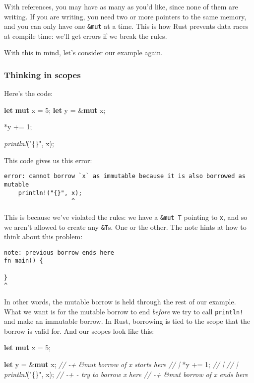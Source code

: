 \documentclass[a4paper,]{book}
\newenvironment{Shaded}{\begin{snugshade}}{\end{snugshade}}
\newcommand{\KeywordTok}[1]{\textcolor[rgb]{0.13,0.29,0.53}{\textbf{{#1}}}}
\newcommand{\DecValTok}[1]{\textcolor[rgb]{0.00,0.00,0.81}{{#1}}}
\newcommand{\StringTok}[1]{\textcolor[rgb]{0.31,0.60,0.02}{{#1}}}
\newcommand{\CommentTok}[1]{\textcolor[rgb]{0.56,0.35,0.01}{\textit{{#1}}}}
\newcommand{\PreprocessorTok}[1]{\textcolor[rgb]{0.56,0.35,0.01}{\textit{{#1}}}}
\newcommand{\NormalTok}[1]{{#1}}
\begin{document}
With references, you may have as many as you'd like, since none of them
are writing. If you are writing, you need two or more pointers to the
same memory, and you can only have one \texttt{\&mut} at a time. This is
how Rust prevents data races at compile time: we'll get errors if we
break the rules.

With this in mind, let's consider our example again.

\subsubsection{Thinking in scopes}\label{thinking-in-scopes}

Here's the code:

\begin{Shaded}
\begin{Highlighting}[]
\KeywordTok{let} \KeywordTok{mut} \NormalTok{x = }\DecValTok{5}\NormalTok{;}
\KeywordTok{let} \NormalTok{y = &}\KeywordTok{mut} \NormalTok{x;}

\NormalTok{*y += }\DecValTok{1}\NormalTok{;}

\PreprocessorTok{println!}\NormalTok{(}\StringTok{"\{\}"}\NormalTok{, x);}
\end{Highlighting}
\end{Shaded}

This code gives us this error:

\begin{verbatim}
error: cannot borrow `x` as immutable because it is also borrowed as mutable
    println!("{}", x);
                   ^
\end{verbatim}

This is because we've violated the rules: we have a \texttt{\&mut\ T}
pointing to \texttt{x}, and so we aren't allowed to create any
\texttt{\&T}s. One or the other. The note hints at how to think about
this problem:

\begin{verbatim}
note: previous borrow ends here
fn main() {

}
^
\end{verbatim}

In other words, the mutable borrow is held through the rest of our
example. What we want is for the mutable borrow to end \emph{before} we
try to call \texttt{println!} and make an immutable borrow. In Rust,
borrowing is tied to the scope that the borrow is valid for. And our
scopes look like this:

\begin{Shaded}
\begin{Highlighting}[]
\KeywordTok{let} \KeywordTok{mut} \NormalTok{x = }\DecValTok{5}\NormalTok{;}

\KeywordTok{let} \NormalTok{y = &}\KeywordTok{mut} \NormalTok{x;    }\CommentTok{// -+ &mut borrow of x starts here}
                   \CommentTok{//  |}
\NormalTok{*y += }\DecValTok{1}\NormalTok{;           }\CommentTok{//  |}
                   \CommentTok{//  |}
\PreprocessorTok{println!}\NormalTok{(}\StringTok{"\{\}"}\NormalTok{, x); }\CommentTok{// -+ - try to borrow x here}
                   \CommentTok{// -+ &mut borrow of x ends here}
\end{Highlighting}
\end{Shaded}
\end{document}

